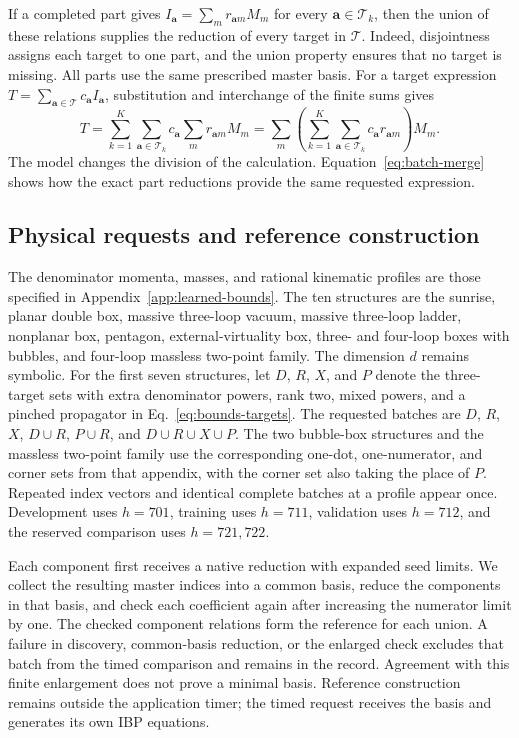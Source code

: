 If a completed part gives
$I_{\boldsymbol a}=\sum_m r_{\boldsymbol a m}M_m$ for every
$\boldsymbol a\in\mathcal T_k$, then the union of these relations supplies
the reduction of every target in $\mathcal T$. Indeed, disjointness assigns
each target to one part, and the union property ensures that no target is
missing. All parts use the same prescribed master basis. For a target
expression $T=\sum_{\boldsymbol a\in\mathcal T}c_{\boldsymbol a}
I_{\boldsymbol a}$, substitution and interchange of the finite sums gives
\begin{equation}
 T=\sum_{k=1}^{K}\sum_{\boldsymbol a\in\mathcal T_k}
       c_{\boldsymbol a}\sum_m r_{\boldsymbol a m}M_m
  =\sum_m\left(\sum_{k=1}^{K}\sum_{\boldsymbol a\in\mathcal T_k}
       c_{\boldsymbol a}r_{\boldsymbol a m}\right)M_m.
 \label{eq:batch-merge}
\end{equation}
The model changes the division of the calculation. Equation~\eqref{eq:batch-merge}
shows how the exact part reductions provide the same requested expression.

\subsection{Physical requests and reference construction}
The denominator momenta, masses, and rational kinematic profiles are those
specified in Appendix~\ref{app:learned-bounds}. The ten structures are the
sunrise, planar double box, massive three-loop vacuum, massive three-loop
ladder, nonplanar box, pentagon, external-virtuality box, three- and four-loop
boxes with bubbles, and four-loop massless two-point family. The dimension
$d$ remains symbolic. For the first seven structures, let $D$, $R$, $X$, and
$P$ denote the three-target sets with extra denominator powers, rank two,
mixed powers, and a pinched propagator in Eq.~\eqref{eq:bounds-targets}.
The requested batches are $D$, $R$, $X$, $D\cup R$, $P\cup R$, and
$D\cup R\cup X\cup P$. The two bubble-box structures and the massless
two-point family use the corresponding one-dot, one-numerator, and corner
sets from that appendix, with the corner set also taking the place of $P$.
Repeated index vectors and identical complete batches at a profile appear
once. Development uses $h=701$, training uses $h=711$, validation uses
$h=712$, and the reserved comparison uses $h=721,722$.

Each component first receives a native reduction with expanded seed limits.
We collect the resulting master indices into a common basis, reduce the
components in that basis, and check each coefficient again after increasing
the numerator limit by one. The checked component relations form the
reference for each union. A failure in discovery, common-basis reduction, or
the enlarged check excludes that batch from the timed comparison and remains
in the record. Agreement with this finite enlargement does not prove a
minimal basis. Reference construction remains outside the application timer;
the timed request receives the basis and generates its own IBP equations.

